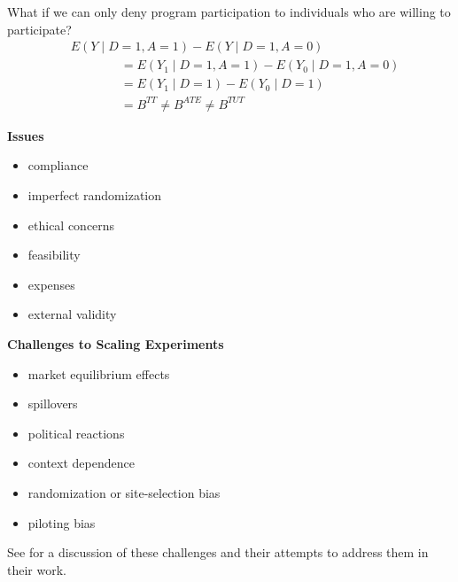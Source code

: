 \begin{frame}
What if we can only deny program participation to individuals who are willing to participate?
\begin{align*}
& E(Y\mid D= 1, A = 1) - E(Y\mid D = 1, A = 0) \\
& \qquad\qquad = E(Y_1\mid D= 1, A = 1) - E(Y_0\mid D=1, A = 0) \\
& \qquad\qquad = E(Y_1\mid D = 1) - E(Y_0 \mid D = 1)  \\
& \qquad\qquad = B^{TT} \neq B^{ATE} \neq B^{TUT}
\end{align*}
\end{frame}
\begin{frame}\textbf{Issues}\vspace{0.3cm}

\begin{itemize}\setlength\itemsep{1em}
\item compliance
\item imperfect randomization
\item ethical concerns
\item feasibility
\item expenses
\item external validity
\end{itemize}
\end{frame}
\begin{frame}\textbf{Challenges to Scaling Experiments}\vspace{0.3cm}

\begin{itemize}\setlength\itemsep{1em}
\item market equilibrium effects
\item spillovers
\item political reactions
\item context dependence
\item randomization or site-selection bias
\item piloting bias\vspace{0.3cm}
\end{itemize}

See  for a discussion of these challenges and their attempts to address them in their work.
\end{frame}

